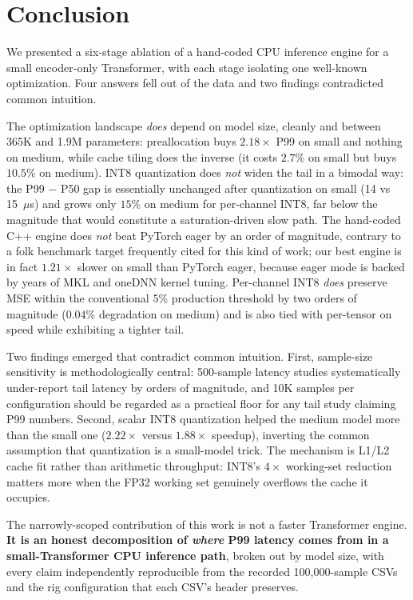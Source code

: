 \documentclass{article}
\begin{document}
\section{Conclusion}
\label{sec:conclusion}

We presented a six-stage ablation of a hand-coded CPU inference engine for a small encoder-only Transformer, with each stage isolating one well-known optimization.
Four answers fell out of the data and two findings contradicted common intuition.

The optimization landscape \emph{does} depend on model size, cleanly and between 365K and 1.9M parameters: preallocation buys $2.18\times$ P99 on small and nothing on medium, while cache tiling does the inverse (it costs $2.7\%$ on small but buys $10.5\%$ on medium).
INT8 quantization does \emph{not} widen the tail in a bimodal way: the P99 $-$ P50 gap is essentially unchanged after quantization on small (14 vs 15~$\mu$s) and grows only $15\%$ on medium for per-channel INT8, far below the magnitude that would constitute a saturation-driven slow path.
The hand-coded C++ engine does \emph{not} beat PyTorch eager by an order of magnitude, contrary to a folk benchmark target frequently cited for this kind of work; our best engine is in fact $1.21\times$ slower on small than PyTorch eager, because eager mode is backed by years of MKL and oneDNN kernel tuning.
Per-channel INT8 \emph{does} preserve MSE within the conventional $5\%$ production threshold by two orders of magnitude ($0.04\%$ degradation on medium) and is also tied with per-tensor on speed while exhibiting a tighter tail.

Two findings emerged that contradict common intuition.
First, sample-size sensitivity is methodologically central: 500-sample latency studies systematically under-report tail latency by orders of magnitude, and 10K samples per configuration should be regarded as a practical floor for any tail study claiming P99 numbers.
Second, scalar INT8 quantization helped the medium model more than the small one ($2.22\times$ versus $1.88\times$ speedup), inverting the common assumption that quantization is a small-model trick.
The mechanism is L1/L2 cache fit rather than arithmetic throughput: INT8's $4\times$ working-set reduction matters more when the FP32 working set genuinely overflows the cache it occupies.

The narrowly-scoped contribution of this work is not a faster Transformer engine.
\textbf{It is an honest decomposition of \emph{where} P99 latency comes from in a small-Transformer CPU inference path}, broken out by model size, with every claim independently reproducible from the recorded 100{,}000-sample CSVs and the rig configuration that each CSV's header preserves.



\end{document}
